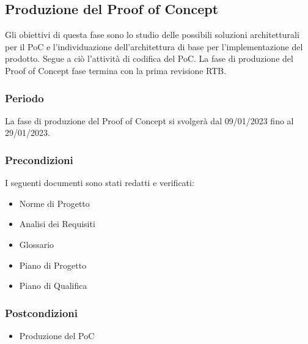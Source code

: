 \subsection{Produzione del Proof of Concept}
Gli obiettivi di questa fase sono lo studio delle possibili soluzioni architetturali per il PoC e l’individuazione dell’architettura di base per l’implementazione del prodotto. Segue a ciò l’attività di codifica del PoC.
La fase di produzione del Proof of Concept fase termina con la prima revisione RTB.

\subsubsection{Periodo}
La fase di produzione del Proof of Concept si svolgerà dal 09/01/2023 fino al 29/01/2023.

\subsubsection{Precondizioni}
I seguenti documenti sono stati redatti e verificati:
\begin{itemize}
	\item Norme di Progetto
	\item Analisi dei Requisiti
	\item Glossario
    \item Piano di Progetto
	\item Piano di Qualifica
\end{itemize}

\subsubsection{Postcondizioni}
\begin{itemize}
	\item Produzione del PoC
\end{itemize}

